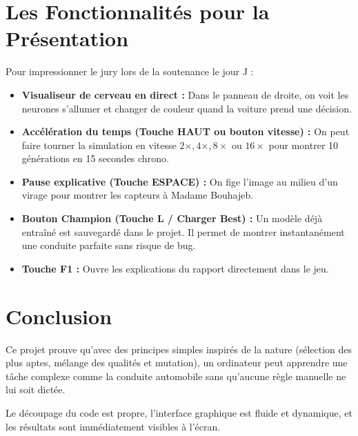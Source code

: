 \documentclass[12pt,a4paper]{article}
\begin{document}
\section{Les Fonctionnalités pour la Présentation}

Pour impressionner le jury lors de la soutenance le jour J :
\begin{itemize}[leftmargin=*]
  \item \textbf{Visualiseur de cerveau en direct :} Dans le panneau de droite, on voit les neurones s'allumer et changer de couleur quand la voiture prend une décision.
  \item \textbf{Accélération du temps (Touche HAUT ou bouton vitesse) :} On peut faire tourner la simulation en vitesse $2\times, 4\times, 8\times$ ou $16\times$ pour montrer 10 générations en 15 secondes chrono.
  \item \textbf{Pause explicative (Touche ESPACE) :} On fige l'image au milieu d'un virage pour montrer les capteurs à Madame Bouhajeb.
  \item \textbf{Bouton Champion (Touche L / Charger Best) :} Un modèle déjà entraîné est sauvegardé dans le projet. Il permet de montrer instantanément une conduite parfaite sans risque de bug.
  \item \textbf{Touche F1 :} Ouvre les explications du rapport directement dans le jeu.
\end{itemize}

\section{Conclusion}
Ce projet prouve qu'avec des principes simples inspirés de la nature (sélection des plus aptes, mélange des qualités et mutation), un ordinateur peut apprendre une tâche complexe comme la conduite automobile sans qu'aucune règle manuelle ne lui soit dictée.

Le découpage du code est propre, l'interface graphique est fluide et dynamique, et les résultats sont immédiatement visibles à l'écran.
\end{document}
